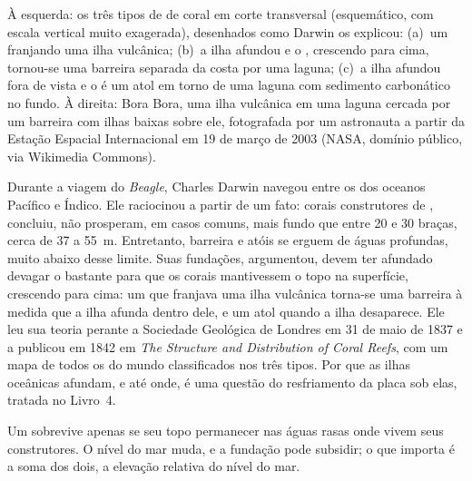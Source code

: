 \begin{omfigure}
{\small À esquerda: os três tipos de  de coral em corte transversal (esquemático, com
escala vertical muito exagerada), desenhados como Darwin os explicou: (a)~um 
franjando uma ilha vulcânica; (b)~a ilha afundou e o , crescendo para cima, tornou-se
uma barreira separada da costa por uma laguna; (c)~a ilha afundou fora de vista e o  é
um atol em torno de uma laguna com sedimento carbonático no fundo. À direita: Bora Bora, uma
ilha vulcânica em uma laguna cercada por um  barreira com ilhas baixas sobre ele,
fotografada por um astronauta a partir da Estação Espacial Internacional em 19 de março de
2003 (NASA, domínio público, via Wikimedia Commons).}
\label{fig:b1:chemical-biogenic-sediments:reefs}
\end{omfigure}

\begin{history}
Durante a viagem do \emph{Beagle}, Charles Darwin navegou entre os  dos oceanos
Pacífico e Índico. Ele raciocinou a partir de um fato: corais construtores de ,
concluiu, não prosperam, em casos comuns, mais fundo que entre 20 e 30 braças, cerca de
37 a \qty{55}{m}. Entretanto,  barreira e atóis se erguem de águas profundas,
muito abaixo desse limite. Suas fundações, argumentou, devem ter afundado devagar o
bastante para que os corais mantivessem o topo na superfície, crescendo para cima: um
 que franjava uma ilha vulcânica torna-se uma barreira à medida que a ilha afunda
dentro dele, e um atol quando a ilha desaparece. Ele leu sua teoria perante a Sociedade
Geológica de Londres em 31 de maio de 1837 e a publicou em 1842 em \emph{The Structure
and Distribution of Coral Reefs}, com um mapa de todos os  do mundo classificados
nos três tipos. Por que as ilhas oceânicas afundam, e até onde, é uma questão do
resfriamento da placa sob elas, tratada no Livro~4.
\end{history}

Um  sobrevive apenas se seu topo permanecer nas águas rasas onde vivem seus
construtores. O nível do mar muda, e a fundação pode subsidir; o que importa é a soma
dos dois, a elevação relativa do nível do mar.

